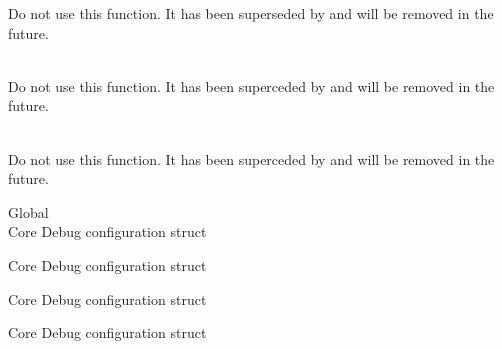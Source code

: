 \begin{DoxyRefList}
\label{deprecated__deprecated000676}%
%
Do not use this function. It has been superseded by  and will be removed in the future.  
\item[Global \doxylink{group___real_f_f_t_ga3df1766d230532bc068fc4ed69d0fcdc}{arm\+\_\+rfft\+\_\+f32} (const \doxylink{structarm__rfft__instance__f32}{arm\+\_\+rfft\+\_\+instance\+\_\+f32} \texorpdfstring{$\ast$}{*}S, \doxylink{arm__math__types_8h_a4611b605e45ab401f02cab15c5e38715}{float32\+\_\+t} \texorpdfstring{$\ast$}{*}p\+Src, \doxylink{arm__math__types_8h_a4611b605e45ab401f02cab15c5e38715}{float32\+\_\+t} \texorpdfstring{$\ast$}{*}p\+Dst)]\hfill \\
\label{deprecated__deprecated000677}%
%
Do not use this function. It has been superceded by  and will be removed in the future.  
\item[Global \doxylink{group___real_f_f_t_ga10717ee326bf50832ef1c25b85a23068}{arm\+\_\+rfft\+\_\+init\+\_\+f32} (\doxylink{structarm__rfft__instance__f32}{arm\+\_\+rfft\+\_\+instance\+\_\+f32} \texorpdfstring{$\ast$}{*}S, \doxylink{structarm__cfft__radix4__instance__f32}{arm\+\_\+cfft\+\_\+radix4\+\_\+instance\+\_\+f32} \texorpdfstring{$\ast$}{*}\+S\+\_\+\+CFFT, uint32\+\_\+t fft\+Len\+Real, uint32\+\_\+t ifft\+FlagR, uint32\+\_\+t bit\+Reverse\+Flag)]\hfill \\
\label{deprecated__deprecated000678}%
%
Do not use this function. It has been superceded by  and will be removed in the future.  
\item[Global \doxylink{group___c_m_s_i_s___core_debug_gab6e30a2b802d9021619dbb0be7f5d63d}{Core\+Debug} ]\hfill \\
\label{deprecated__deprecated000100}%
%
Core Debug configuration struct 

\label{deprecated__deprecated000154}%
%
Core Debug configuration struct 

\label{deprecated__deprecated000230}%
%
Core Debug configuration struct 

\label{deprecated__deprecated000293}%
%
Core Debug configuration struct 


\end{DoxyRefList}
